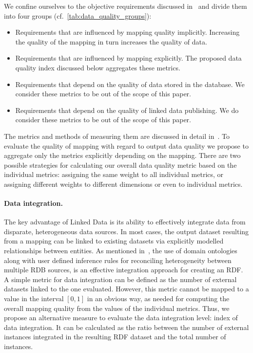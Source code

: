 We confine ourselves to the objective requirements discussed in~\cite{Zaveri} and divide them into four groups (cf.~\autoref{tab:data_quality_groups}):

\begin{itemize}
	\item Requirements that are influenced by mapping quality implicitly.
		Increasing the quality of the mapping in turn increases the quality of data.
	\item Requirements that are influenced by mapping explicitly.
		The proposed data quality index discussed below aggregates these metrics.
	\item Requirements that depend on the quality of data stored in the database. 
		We consider these metrics to be out of the scope of this paper.
	\item Requirements that depend on the quality of linked data publishing.
		We do consider these metrics to be out of the scope of this paper.
\end{itemize}

The metrics and methods of measuring them are discussed in detail in~\cite{Zaveri}.
To evaluate the quality of mapping with regard to output data quality we propose to aggregate only the metrics explicitly depending on the mapping.
There are two possible strategies for calculating our overall data quality metric based on the individual metrics: assigning the same weight to all individual metrics, or assigning different weights to different dimensions or even to individual metrics.

\paragraph{Data integration.}
The key advantage of Linked Data is its ability to effectively integrate data from disparate, heterogeneous data sources.
In most cases, the output dataset resulting from a mapping can be linked to existing datasets via explicitly modelled relationships between entities.
As mentioned in~\cite{sahoo2009survey}, the use of domain ontologies along with user defined inference rules for reconciling heterogeneity between multiple RDB sources, is an effective integration approach for creating an RDF. 
A simple metric for data integration can be defined as the number of external datasets linked to the one evaluated.
However, this metric cannot be mapped to a value in the interval $[0,1]$ in an obvious way, as needed for computing the overall mapping quality from the values of the individual metrics.
Thus, we propose an alternative measure to evaluate the data integration level: index of data integration.
It can be calculated as the ratio between the number of external instances integrated in the resulting RDF dataset and the total number of instances.

